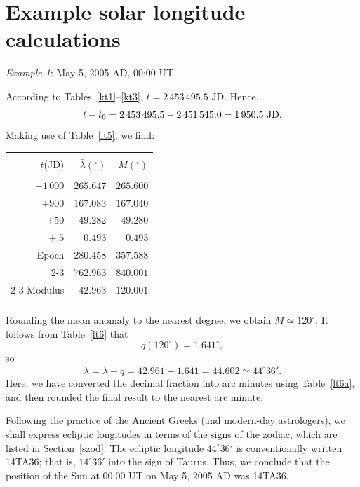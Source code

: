 \section{Example solar longitude calculations}
\begin{center}
 {\em Example 1}: May 5, 2005 AD, 00:00 UT
\end{center}
According to Tables~\ref{kt1}--\ref{kt3}, $t = 2\,453\,495.5$ JD. Hence,
$$t-t_0 = 2\,453\,495.5-2\,451\,545.0=1\,950.5~{\rm JD}.$$ 
Making use of
Table~\ref{lt5}, we find:
\begin{center}
\begin{tabular}{rrr}
&&\\
$t$(JD) & $ \bar{\lambda}(^\circ)$ & $M(^\circ)$\\[-2ex]
&&\\
$+1\,000$ & $265.647$ & $265.600$\\
$+900$ & $167.083$ & $167.040$\\
$+50$ & $49.282$ & $49.280$\\
$+.5$ & $0.493$ & $0.493$\\
Epoch & $280.458$ & $357.588$\\\cline{2-3}
&$762.963$ & $840.001$\\\cline{2-3}
Modulus & $42.963$ & $120.001$\\ 
&&\\
\end{tabular}
\end{center}
Rounding the mean anomaly to the nearest degree, we obtain $M\simeq 120^\circ$.
It follows from  Table~\ref{lt6} that
$$
q(120^\circ)= 1.641^\circ,
$$ 
so
$$
\lambda =\bar{\lambda} + q =42.961+ 1.641=44.602\simeq 44^\circ36'.
$$
Here, we have converted the decimal fraction into arc
minutes using Table~\ref{lt6a}, and 
then rounded the final result to the nearest arc minute.

 Following
the practice of the Ancient Greeks (and modern-day astrologers), we shall express ecliptic longitudes
in terms of the  signs of the zodiac, which  are listed in Section~\ref{szod}. The ecliptic longitude $44^\circ36'$ is conventionally written 14TA36;  that is, 
$14^\circ36'$ into the sign of Taurus. Thus, we conclude that the position of
the Sun 
at 00:00 UT on May 5, 2005 AD was 14TA36.

